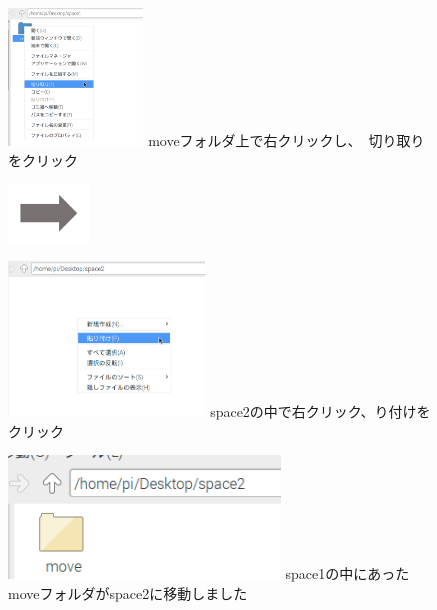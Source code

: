 \documentclass[a4paper,12pt]{jarticle}
\begin{document}
\begin{figure}[ht]
  \centering
  \begin{minipage}{6.589cm}
    \includegraphics[width=3.584cm,height=3.658cm]{textbook-img048.png}
    {
      moveフォルダ上で右クリックし、　切り取りをクリック
    }
  \end{minipage}
  \includegraphics[width=2.168cm,height=1.542cm]{textbook-img049.png}
  \begin{minipage}{6.589cm}
    \includegraphics[width=5.225cm,height=4.119cm]{textbook-img046.png}
    {
      space2の中で右クリック、り付けをクリック
    }
  \end{minipage}

  \begin{minipage}{6.589cm}
    \includegraphics[width=7.218cm,height=3.281cm]{textbook-img045.png}
    {
      space1の中にあったmoveフォルダがspace2に移動しました
    }
  \end{minipage}


\end{figure}
\end{document}
